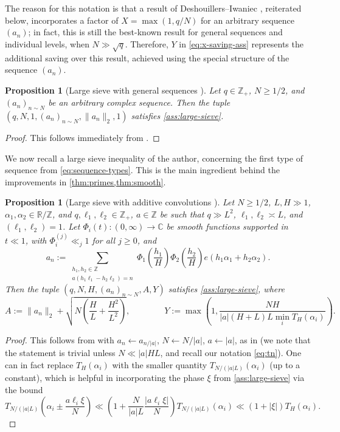 \documentclass[reqno,11pt]{amsart}
\newtheorem{proposition}[theorem]{Proposition}
\theoremstyle{remark}
\numberwithin{equation}{section}
\newcommand{\Z}{\mathbb{Z}}
\newcommand{\R}{\mathbb{R}}
\newcommand{\C}{\mathbb{C}}
\begin{document}
The reason for this notation is that a result of Deshouillers--Iwaniec \cite{deshouillers1982kloosterman}, reiterated below, incorporates a factor of $X = \max(1, q/N)$ for an arbitrary sequence $(a_n)$; in fact, this is still the best-known result for general sequences and individual levels, when $N \gg \sqrt{q}$. Therefore, $Y$ in \cref{eq:x-saving-ass} represents the additional saving over this result, achieved using the special structure of the sequence $(a_n)$.

\begin{proposition}[Large sieve with general sequences \cite{deshouillers1982kloosterman}] \label{prop:large-sieve-general}
    Let $q \in \Z_+$, $N \ge 1/2$, and $(a_n)_{n \sim N}$ be an arbitrary complex sequence. Then the tuple $(q, N, 1, (a_n)_{n \sim N}, \|a_n\|_2, 1)$ satisfies \cref{ass:large-sieve}.
\end{proposition}
\begin{proof}
This follows immediately from \cite[Theorems 2 and 5]{deshouillers1982kloosterman}.
\end{proof}

We now recall a large sieve inequality of the author, concerning the first type of sequence from \cref{eq:sequence-types}. This is the main ingredient behind the improvements in \cref{thm:primes,thm:smooth}.

\begin{proposition}[Large sieve with additive convolutions \cite{pascadi2024large}] \label{prop:large-sieve-additive}
Let $N \ge 1/2$, $L, H \gg 1$, $\alpha_1, \alpha_2 \in \R/\Z$, and $q, \ell_1, \ell_2 \in \Z_+$, $a \in \Z$ be such that $q \gg L^2$, $\ell_1, \ell_2 \asymp L$, and $(\ell_1, \ell_2) = 1$. Let $\Phi_i(t) : (0, \infty) \to \C$ be smooth functions supported in $t \ll 1$, with $\Phi_i^{(j)} \ll_j 1$ for all $j \ge 0$, and
\[
    a_n := \sum_{\substack{h_1, h_2 \in \Z \\ a(h_1 \ell_1 - h_2 \ell_2) = n}} \Phi_1\left(\frac{h_1}{H}\right) \Phi_2\left(\frac{h_2}{H}\right) e(h_1 \alpha_1 + h_2 \alpha_2).
\]
Then the tuple $(q, N, H, (a_n)_{n \sim N}, A, Y)$ satisfies \cref{ass:large-sieve}, where
\[
    A := \|a_n\|_2 + \sqrt{N \left(\frac{H}{L} + \frac{H^2}{L^2}\right)}, \qquad\qquad Y := \max\left(1, \frac{NH}{|a|(H+L)L\min_i T_H(\alpha_i)}\right).
\]
\end{proposition}
\begin{proof}
This follows from \cite[Theorem 3]{pascadi2024large} with $a_n \gets a_{n/|a|}$, $N \gets N/|a|$, $a \gets |a|$, as in \cite[(5.18)]{pascadi2024large} (we note that the statement is trivial unless $N \ll |a|HL$, and recall our notation \cref{eq:tn}). One can in fact replace $T_H(\alpha_i)$ with the smaller quantity $T_{N/(|a|L)}(\alpha_i)$ (up to a constant), which is helpful in incorporating the phase $\xi$ from \cref{ass:large-sieve} via the bound
\[
    T_{N/(|a|L)}\left(\alpha_i \pm \frac{a\ell_i \xi}{N} \right) \ll \left(1 + \frac{N}{|a|L} \frac{|a \ell_i \xi|}{N}\right) T_{N/(|a|L)}(\alpha_i) \ll (1 + |\xi|) T_H(\alpha_i).
\]
\end{proof}
\end{document}
